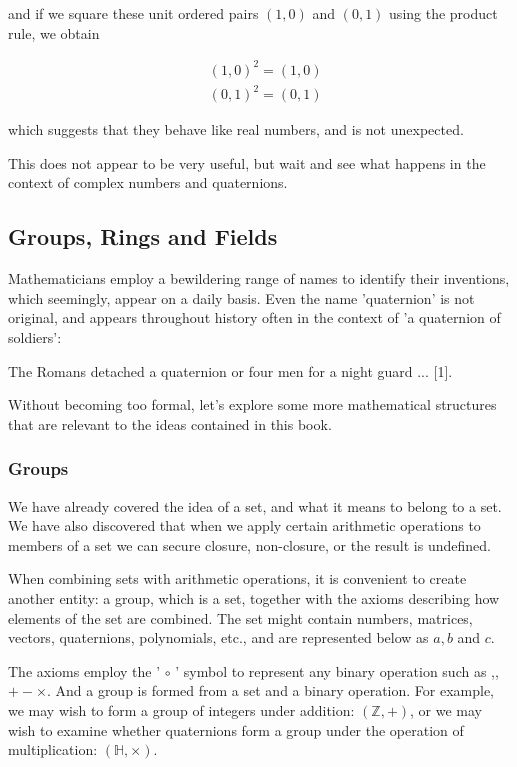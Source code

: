 \documentclass[10pt]{article}
\begin{document}
and if we square these unit ordered pairs $(1,0)$ and $(0,1)$ using the product rule, we obtain

$$
\begin{aligned}
& (1,0)^{2}=(1,0) \\
& (0,1)^{2}=(0,1)
\end{aligned}
$$

which suggests that they behave like real numbers, and is not unexpected.

This does not appear to be very useful, but wait and see what happens in the context of complex numbers and quaternions.

\subsection{Groups, Rings and Fields}
Mathematicians employ a bewildering range of names to identify their inventions, which seemingly, appear on a daily basis. Even the name 'quaternion' is not original, and appears throughout history often in the context of 'a quaternion of soldiers':

The Romans detached a quaternion or four men for a night guard ... [1].

Without becoming too formal, let's explore some more mathematical structures that are relevant to the ideas contained in this book.

\subsubsection{Groups}
We have already covered the idea of a set, and what it means to belong to a set. We have also discovered that when we apply certain arithmetic operations to members of a set we can secure closure, non-closure, or the result is undefined.

When combining sets with arithmetic operations, it is convenient to create another entity: a group, which is a set, together with the axioms describing how elements of the set are combined. The set might contain numbers, matrices, vectors, quaternions, polynomials, etc., and are represented below as $a, b$ and $c$.

The axioms employ the ' $\circ$ ' symbol to represent any binary operation such as ,,$+- \times$. And a group is formed from a set and a binary operation. For example, we may wish to form a group of integers under addition: $(\mathbb{Z},+)$, or we may wish to examine whether quaternions form a group under the operation of multiplication: $(\mathbb{H}, \times)$.
\end{document}
